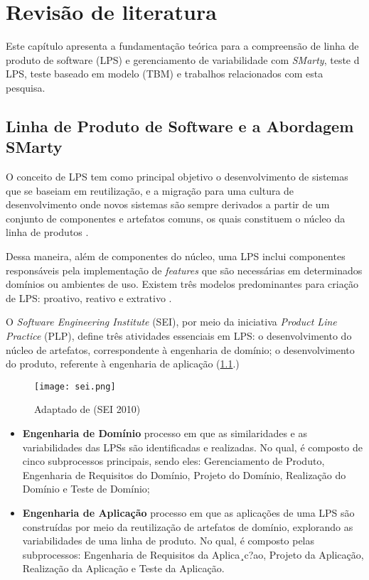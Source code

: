 \chapter{Revisão de literatura}
\label{sec:revisao}
Este capítulo apresenta a fundamentação teórica para a compreensão de linha de produto de software (LPS) e gerenciamento de variabilidade com \textit{SMarty}, teste d LPS, teste baseado em modelo (TBM) e trabalhos relacionados com esta pesquisa.


\section{Linha de Produto de Software e a Abordagem SMarty}
\label{sec:conc_basicos}
O conceito de LPS tem como principal objetivo o desenvolvimento de sistemas que se baseiam em reutilização, e a migração para uma cultura de desenvolvimento onde novos sistemas são sempre derivados a partir de um conjunto de componentes e artefatos comuns, os quais constituem o núcleo da linha de produtos \cite{linden2007product}. 

Dessa maneira, além de componentes do núcleo, uma LPS inclui componentes responsáveis pela implementação de \textit{features} que são necessárias em determinados domínios ou ambientes de uso. Existem três modelos predominantes para criação de LPS: proativo, reativo e extrativo \cite{pohl2005software}.

O \textit{Software Engineering Institute} (SEI), por meio da iniciativa \textit{Product Line Practice} (PLP), define três atividades essenciais em LPS: o desenvolvimento do núcleo de artefatos, correspondente à engenharia de domínio; o desenvolvimento do produto, referente à engenharia de aplicação (\ref{fig:sei}.)

\begin{figure}[htb]
	\centering
	\texttt{[image: sei.png]}
	\caption{Adaptado de (SEI 2010) }
	\label{fig:sei}
\end{figure}
\newpage
\begin{itemize}
	\item \textbf{Engenharia de Domínio} processo em que as similaridades e as variabilidades das LPSs são identificadas e realizadas. No qual, é composto de cinco subprocessos principais, sendo eles: Gerenciamento de Produto, Engenharia de Requisitos do Domínio, Projeto do Domínio, Realização do Domínio e Teste de Domínio;
	\item \textbf{Engenharia de Aplicação} processo em que as aplicações de uma LPS são construídas por meio da reutilização de artefatos de domínio, explorando as variabilidades de uma linha de produto. No qual, é composto pelas subprocessos: Engenharia de Requisitos da Aplica¸c?ao, Projeto da Aplicação, Realização da Aplicação e Teste da Aplicação.
\end{itemize}

